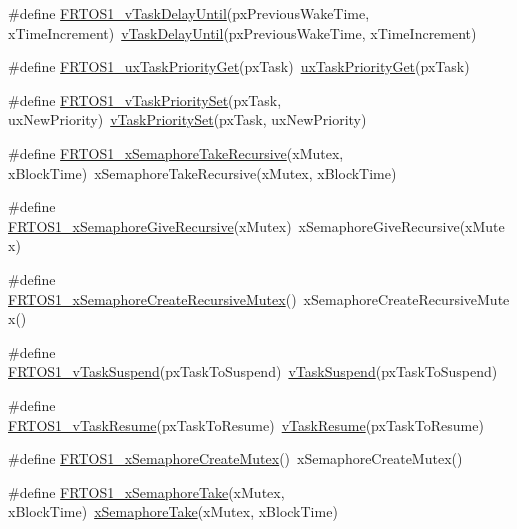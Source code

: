 \begin{DoxyCompactItemize}
\#define \hyperlink{group___f_r_t_o_s1__module_gaac0258bd4992309055d82679f3ed2c71}{F\+R\+T\+O\+S1\+\_\+v\+Task\+Delay\+Until}(px\+Previous\+Wake\+Time,  x\+Time\+Increment)~\hyperlink{tasks_8c_abbc32467f223c78ba36f577b56a32897}{v\+Task\+Delay\+Until}(px\+Previous\+Wake\+Time, x\+Time\+Increment)
\item 
\#define \hyperlink{group___f_r_t_o_s1__module_gab9e7a0524de943a16f69ee914a73f8c6}{F\+R\+T\+O\+S1\+\_\+ux\+Task\+Priority\+Get}(px\+Task)~\hyperlink{tasks_8c_ad8b107714d1aa93374558fbed8727748}{ux\+Task\+Priority\+Get}(px\+Task)
\item 
\#define \hyperlink{group___f_r_t_o_s1__module_ga23d9e89eba01c0ee9728034c78d496a4}{F\+R\+T\+O\+S1\+\_\+v\+Task\+Priority\+Set}(px\+Task,  ux\+New\+Priority)~\hyperlink{tasks_8c_a364e424f7bf8efced5738f44803f6580}{v\+Task\+Priority\+Set}(px\+Task, ux\+New\+Priority)
\item 
\#define \hyperlink{group___f_r_t_o_s1__module_ga6593f05f6a61d2cbcc758280687799e4}{F\+R\+T\+O\+S1\+\_\+x\+Semaphore\+Take\+Recursive}(x\+Mutex,  x\+Block\+Time)~x\+Semaphore\+Take\+Recursive(x\+Mutex, x\+Block\+Time)
\item 
\#define \hyperlink{group___f_r_t_o_s1__module_ga4f388c91ba2f9499d9e6a5f0423e1312}{F\+R\+T\+O\+S1\+\_\+x\+Semaphore\+Give\+Recursive}(x\+Mutex)~x\+Semaphore\+Give\+Recursive(x\+Mutex)
\item 
\#define \hyperlink{group___f_r_t_o_s1__module_ga317f1f005a09cdbe6847dfb5f70d615d}{F\+R\+T\+O\+S1\+\_\+x\+Semaphore\+Create\+Recursive\+Mutex}()~x\+Semaphore\+Create\+Recursive\+Mutex()
\item 
\#define \hyperlink{group___f_r_t_o_s1__module_ga4951eb3c0e567bbfa7fe61c2285ede9d}{F\+R\+T\+O\+S1\+\_\+v\+Task\+Suspend}(px\+Task\+To\+Suspend)~\hyperlink{tasks_8c_a7fa54417f854974ae4a2b38729b60f12}{v\+Task\+Suspend}(px\+Task\+To\+Suspend)
\item 
\#define \hyperlink{group___f_r_t_o_s1__module_ga3c579d386291c86d2a541b60269d37cf}{F\+R\+T\+O\+S1\+\_\+v\+Task\+Resume}(px\+Task\+To\+Resume)~\hyperlink{tasks_8c_ad8abaa814e2cfc4830c276415d0935bb}{v\+Task\+Resume}(px\+Task\+To\+Resume)
\item 
\#define \hyperlink{group___f_r_t_o_s1__module_gab8e8fcdf8b7ab36ee13bdefd97034ec2}{F\+R\+T\+O\+S1\+\_\+x\+Semaphore\+Create\+Mutex}()~x\+Semaphore\+Create\+Mutex()
\item 
\#define \hyperlink{group___f_r_t_o_s1__module_ga29d5d4c3ac382b41af7ead92376a5c2b}{F\+R\+T\+O\+S1\+\_\+x\+Semaphore\+Take}(x\+Mutex,  x\+Block\+Time)~\hyperlink{semphr_8h_af116e436d2a5ae5bd72dbade2b5ea930}{x\+Semaphore\+Take}(x\+Mutex, x\+Block\+Time)

\end{DoxyCompactItemize}
